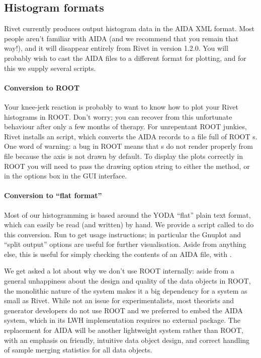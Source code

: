 \documentclass{JHEP3}
\begin{document}
\subsection{Histogram formats}

Rivet currently produces output histogram data in the AIDA XML format. Most
people aren't familiar with AIDA (and we recommend that you remain that way!),
and it will disappear entirely from Rivet in version 1.2.0. You will probably
wish to cast the AIDA files to a different format for plotting, and for this we
supply several scripts.

\paragraph{Conversion to ROOT}

Your knee-jerk reaction is probably to want to know how to plot your Rivet
histograms in ROOT. Don't worry; you can recover from this unfortunate behaviour
after only a few months of therapy. For unrepentant ROOT junkies, Rivet installs
an  script, which converts the AIDA records to a  file
full of ROOT s. One word of warning: a bug in ROOT means that
s do not render properly from file because the axis is not drawn by
default. To display the plots correctly in ROOT you will need to pass the
 drawing option string to either the  method, or
in the options box in the  GUI interface.

\paragraph{Conversion to ``flat format''}

Most of our histogramming is based around the YODA ``flat'' plain text format,
which can easily be read (and written) by hand. We provide a script called
 to do this conversion. Run  to get usage
instructions; in particular the Gnuplot and ``split output'' options are useful
for further visualisation. Aside from anything else, this is useful for simply
checking the contents of an AIDA file, with .

\vspace{1.8em}

\begin{detail}
  We get asked a lot about why we don't use ROOT internally: aside from a
  general unhappiness about the design and quality of the data objects in ROOT,
  the monolithic nature of the system makes it a big dependency for a system as
  small as Rivet. While not an issue for experimentalists, most theorists and
  generator developers do not use ROOT and we preferred to embed the AIDA
  system, which in its LWH implementation requires no external package. The
  replacement for AIDA will be another lightweight system rather than ROOT, with
  an emphasis on friendly, intuitive data object design, and correct handling of
  sample merging statistics for all data objects.
\end{detail}
\end{document}
